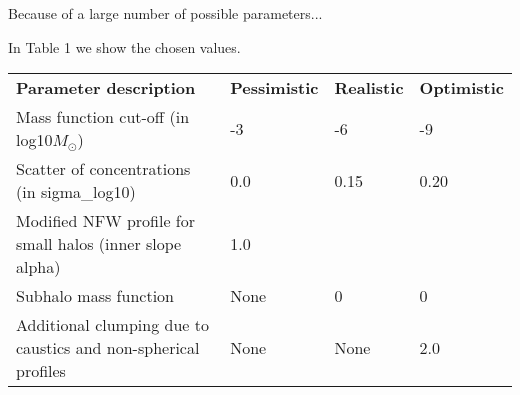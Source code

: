 Because of a large number of possible parameters...

In Table 1 we show the chosen values.

\begin{table}
    \begin{tabular}{llll}
    \textbf{Parameter description}                                    & \textbf{Pessimistic} & \textbf{Realistic} & \textbf{Optimistic} \hline \hline \\
    Mass function cut-off (in log10$M_\odot$)        & -3 & -6 & -9 \\
    Scatter of concentrations (in sigma\_log10)              & 0.0 & 0.15 & 0.20 \\
    Modified NFW profile for small halos (inner slope alpha) & 1.0 & \cite{Ishiyama_2014} &  \cite{Ishiyama_2014} \\
    Subhalo mass function & None & 0 & 0 \\
    Additional clumping due to caustics and non-spherical profiles & None & None & 2.0
\\    \end{tabular}
\end{table}